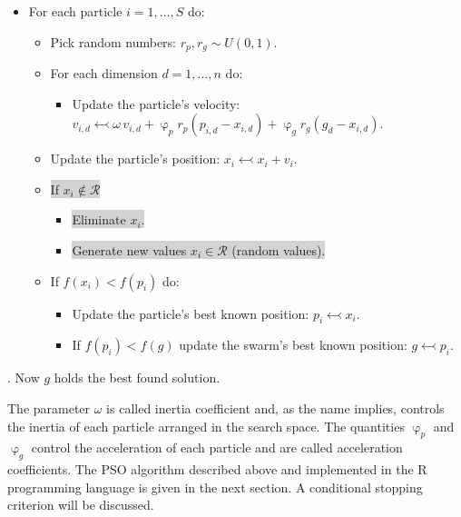\documentclass[10pt,letterpaper]{article}
\begin{document}
\begin{itemize}

\item
For each particle $i = 1,\ldots, S$ do:
\begin{itemize}

\item
Pick random numbers: $r_p, r_g \sim U(0,1)$.

\item
For each dimension $d = 1,\ldots, n$ do:
\begin{itemize}

\item
Update the particle's velocity: $v_{i,d} \leftarrowtail \omega \, v_{i,d} + \upvarphi_p r_p (p_{i,d}-x_{i,d}) + \upvarphi_g r_g (g_d-x_{i,d})$.
\end{itemize}

\item
Update the particle's position: $x_i \leftarrowtail x_i + v_i$.

\item
\colorbox{lightgray}{If $x_i \not\in \mathcal{R}$}
\begin{itemize}

\item
\colorbox{lightgray}{Eliminate $x_i$.}

\item
\colorbox{lightgray}{Generate new values $x_i \in \mathcal{R}$ (random values).}

\end{itemize}
\item
If $f(x_i) < f(p_i)$ do:
\begin{itemize}

\item
Update the particle's best known position: $p_i \leftarrowtail x_i$.

\item
If $f(p_i) < f(g)$ update the swarm's best known position: $g \leftarrowtail p_i$.

\end{itemize}

\end{itemize}

\end{itemize}
. Now $g$ holds the best found solution.

The parameter $\omega$ is called inertia coefficient and, as the name implies, controls the inertia of each particle arranged in the search space.
The quantities $\upvarphi_p$ and $\upvarphi_g$ control the acceleration of each particle and are called acceleration coefficients.
The PSO algorithm described
above and implemented in the \textsc{R} programming language is given in the next section.
A conditional stopping criterion will be discussed.
\end{document}
